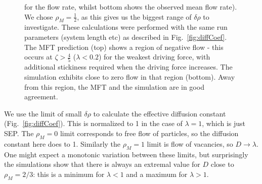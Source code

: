 \documentclass[
reprint, amsmath,amssymb, aps,
 prx,
]{revtex4-1}
\begin{document}
\begin{figure}[h!]
{for the flow rate, whilst bottom shows the observed mean flow rate).
We chose $\rho_M=\frac{1}{2}$, as this gives us the biggest range of $\delta\rho$ to investigate.
These calculations were performed with the same run parameters (system length etc) as described in Fig.~\ref{fig:diffCoef}.
The MFT prediction (top) shows a region of
negative flow - this occurs at $\zeta > \frac{4}{5}$ ($\lambda < 0.2$) for the weakest
driving force, with additional stickiness required when the driving
force increases. The simulation exhibits close to zero flow in that
region (bottom).  Away from this region, the MFT and
the simulation are in good agreement.
}
\end{figure}
We use the limit of small $\delta\rho$ to calculate the effective
diffusion constant (Fig.~\ref{fig:diffCoef}).  This is normalized to 1 in the case of
$\lambda=1$, which is just SEP.  The $\rho_M=0$ limit corresponds to
free flow of particles, so the diffusion constant here does to
1. Similarly the $\rho_M=1$ limit is flow of vacancies, so
$D\rightarrow\lambda$.  One might expect a monotonic variation between
these limits, but surprisingly the simulations show that there is
always an extremal value for $D$ close to $\rho_M=2/3$: this is a
minimum for $\lambda<1$ and a maximum for $\lambda>1$.
\end{document}
